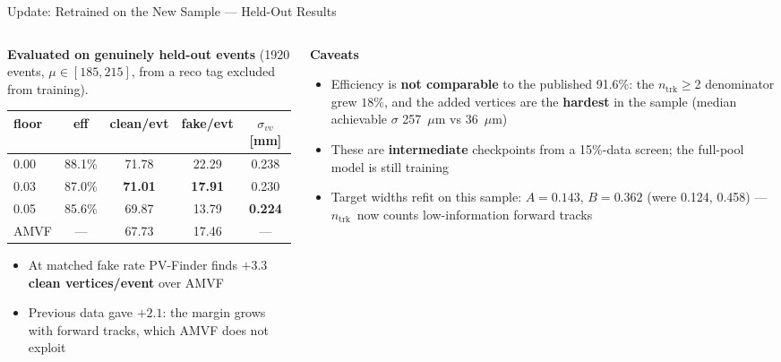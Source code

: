 \documentclass[xcolor=table,aspectratio=169]{beamer}
\newcommand{\ntrk}{\ensuremath{n_\mathrm{trk}}}
\begin{document}
\begin{frame}{Update: Retrained on the New Sample --- Held-Out Results}
    \begin{columns}[T]
        \begin{column}{0.56\linewidth}
            \textbf{Evaluated on genuinely held-out events} (1920 events, $\mu\in[185,215]$,
            from a reco tag excluded from training).
            \vspace{0.3em}
            {\footnotesize
            \begin{tabular}{lcccc}
                \hline
                floor & eff & clean/evt & fake/evt & $\sigma_{vv}$ [mm] \\
                \hline
                0.00 & 88.1\% & 71.78 & 22.29 & 0.238 \\
                0.03 & 87.0\% & \textbf{71.01} & \textbf{17.91} & 0.230 \\
                0.05 & 85.6\% & 69.87 & 13.79 & \textbf{0.224} \\
                \hline
                AMVF & --- & 67.73 & 17.46 & --- \\
                \hline
            \end{tabular}}
            \vspace{0.5em}
            \begin{itemize}\setlength\itemsep{0.25em}
                \item At matched fake rate PV-Finder finds
                      \textbf{$+3.3$ clean vertices/event} over AMVF
                \item Previous data gave \textbf{$+2.1$}: the margin grows with
                      forward tracks, which AMVF does not exploit
            \end{itemize}
        \end{column}
        \begin{column}{0.42\linewidth}
            \textbf{Caveats}
            \begin{itemize}\footnotesize\setlength\itemsep{0.25em}
                \item Efficiency is \textbf{not comparable} to the published
                      91.6\%: the \ntrk$\ge$2 denominator grew $18\%$, and the
                      added vertices are the \textbf{hardest} in the sample
                      (median achievable $\sigma$ 257~$\mu$m vs 36~$\mu$m)
                \item These are \textbf{intermediate} checkpoints from a 15\%-data
                      screen; the full-pool model is still training
                \item Target widths refit on this sample:
                      $A\!=\!0.143$, $B\!=\!0.362$ (were 0.124, 0.458) ---
                      \ntrk\ now counts low-information forward tracks
            \end{itemize}
        \end{column}
    \end{columns}
\end{frame}
\end{document}
